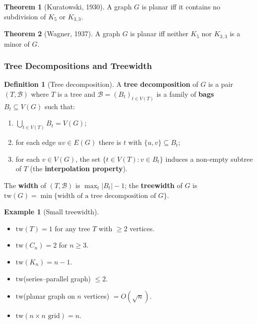 \documentclass{article}
\theoremstyle{definition}
\newtheorem{example}{Example}
\newtheorem{theorem}{Theorem}
\newtheorem{definition}{Definition}
\begin{document}
\begin{theorem}[Kuratowski, 1930]\label{thm:kuratowski}
A graph $G$ is planar iff it contains no subdivision of $K_5$ or
$K_{3, 3}$.
\end{theorem}

\begin{theorem}[Wagner, 1937]\label{thm:wagner}
A graph $G$ is planar iff neither $K_5$ nor $K_{3, 3}$ is a minor of
$G$.
\end{theorem}

\subsubsection{Tree Decompositions and Treewidth}

\begin{definition}[Tree decomposition]\label{def:tw}
A \textbf{tree decomposition} of $G$ is a pair $(T, \mathcal B)$ where
$T$ is a tree and $\mathcal B = (B_t)_{t \in V(T)}$ is a family of
\textbf{bags} $B_t \subseteq V(G)$ such that:
\begin{enumerate}
  \item $\bigcup_{t \in V(T)} B_t = V(G)$;
  \item for each edge $uv \in E(G)$ there is $t$ with $\{u, v\} \subseteq B_t$;
  \item for each $v \in V(G)$, the set $\{t \in V(T) : v \in B_t\}$
        induces a non-empty subtree of $T$ (the \textbf{interpolation
        property}).
\end{enumerate}
The \textbf{width} of $(T, \mathcal B)$ is $\max_{t} |B_t| - 1$; the
\textbf{treewidth} of $G$ is
$\mathrm{tw}(G) = \min\{\text{width of a tree decomposition of } G\}$.
\end{definition}

\begin{example}[Small treewidth]
\mbox{}
\begin{itemize}
  \item $\mathrm{tw}(T) = 1$ for any tree $T$ with $\ge 2$ vertices.
  \item $\mathrm{tw}(C_n) = 2$ for $n \ge 3$.
  \item $\mathrm{tw}(K_n) = n - 1$.
  \item $\mathrm{tw}$(series--parallel graph) $\le 2$.
  \item $\mathrm{tw}$(planar graph on $n$ vertices) $= O(\sqrt n)$.
  \item $\mathrm{tw}(n \times n \text{ grid}) = n$.
\end{itemize}
\end{example}
\end{document}
